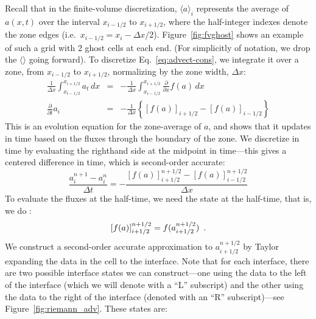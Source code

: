 Recall that in the finite-volume discretization, $\langle a\rangle_i$
represents the average of $a(x,t)$ over the interval $x_{i-1/2}$ to
$x_{i+1/2}$, where the half-integer indexes denote the zone edges
(i.e.\ $x_{i-1/2} = x_i - \Delta x/2$).  Figure~\ref{fig:fvghost}
shows an example of such a grid with 2 ghost cells at each end.  (For
simplicitly of notation, we drop the $\langle \rangle$ going forward).
To discretize Eq.~\ref{eq:advect-cons}, we integrate it over a zone,
from ${x_{i-1/2}}$ to ${x_{i+1/2}}$, normalizing by the zone width,
$\Delta x$:
\begin{eqnarray}
\frac{1}{\Delta x} \int_{x_{i-1/2}}^{x_{i+1/2}} a_t \, dx &=& 
   - \frac{1}{\Delta x} \int_{x_{i-1/2}}^{x_{i+1/2}} \frac{\partial}{\partial x} f(a) \, dx \\
\frac{\partial}{\partial t} a_i &=& 
   - \frac{1}{\Delta x} \left \{ \left [f(a) \right ]_{i+1/2} - \left [f(a) \right ]_{i-1/2} \right \}
\end{eqnarray}
This is an evolution equation for the zone-average of $a$, and shows
that it updates in time based on the fluxes through the boundary of
the zone.  We discretize in time by evaluating the righthand side at
the midpoint in time---this gives a centered difference in time, which
is second-order accurate:
\begin{equation}
\frac{a_i^{n+1} - a_i^n}{\Delta t} = -\frac{\left [f(a) \right ]_{i+1/2}^{n+1/2} - \left [f(a) \right ]_{i-1/2}^{n+1/2}}{\Delta x}
\label{eq:consupdate1d}
\end{equation}
To evaluate the fluxes at the half-time, we need the state at the
half-time, that is, we do :
\begin{equation}
\left [f(a) \right ]_{i+1/2}^{n+1/2} = f(a_{i+1/2}^{n+1/2}) \enskip .
\end{equation}
We construct a second-order accurate approximation to
$a_{i+1/2}^{n+1/2}$ by Taylor expanding the data in the cell to the
interface.  Note that for each interface, there are two possible
interface states we can construct---one using the data to the left of
the interface (which we will denote with a ``L'' subscript) and the
other using the data to the right of the interface (denoted with an
``R'' subscript)---see Figure~\ref{fig:riemann_adv}.  These states are:
